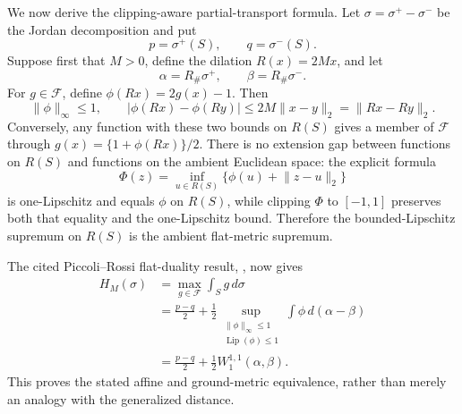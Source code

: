 We now derive the clipping-aware partial-transport formula.  Let \(\sigma=\sigma^+-\sigma^-\) be the Jordan decomposition and put
\[
 p=\sigma^+(S),\qquad q=\sigma^-(S).
\]
Suppose first that \(M>0\), define the dilation \(R(x)=2Mx\), and let
\[
 \alpha=R_\#\sigma^+,
 \qquad
 \beta=R_\#\sigma^-.
\]
For \(g\in\mathcal F\), define \(\phi(Rx)=2g(x)-1\).  Then
\[
 \lVert\phi\rVert_\infty\leq1,
 \qquad
 \lvert\phi(Rx)-\phi(Ry)\rvert
 \leq 2M\lVert x-y\rVert_2
 =\lVert Rx-Ry\rVert_2.
\]
Conversely, any function with these two bounds on \(R(S)\) gives a member of \(\mathcal F\) through \(g(x)=\{1+\phi(Rx)\}/2\).  There is no extension gap between functions on \(R(S)\) and functions on the ambient Euclidean space: the explicit formula
\[
 \Phi(z)=\inf_{u\in R(S)}\{\phi(u)+\lVert z-u\rVert_2\}
\]
is one-Lipschitz and equals \(\phi\) on \(R(S)\), while clipping \(\Phi\) to \([-1,1]\) preserves both that equality and the one-Lipschitz bound.  Therefore the bounded-Lipschitz supremum on \(R(S)\) is the ambient flat-metric supremum.

The cited Piccoli--Rossi flat-duality result, \cite[Definition 12 and Theorem 13]{PiccoliRossi2016GeneralizedWasserstein}, now gives
\[
\begin{aligned}
 H_M(\sigma)
 &=\max_{g\in\mathcal F}\int_S g\,d\sigma\\
 &=\frac{p-q}{2}
   +\frac12\sup_{\substack{\lVert\phi\rVert_\infty\leq1\\
                             \operatorname{Lip}(\phi)\leq1}}
       \int \phi\,d(\alpha-\beta)\\
 &=\frac{p-q}{2}+\frac12W_1^{1,1}(\alpha,\beta).
\end{aligned}
\]
This proves the stated affine and ground-metric equivalence, rather than merely an analogy with the generalized distance.

